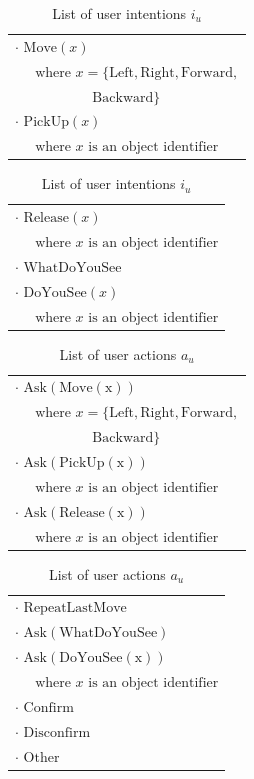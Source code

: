 \renewcommand{\arraystretch}{1.3}

\begin{table}[p]
\begin{footnotesize}
\begin{tabular}{p{60mm}} 
$\cdot$ $\mathrm{Move}(x) $ \\ $ \ \ \ \ \ \text{ where } x=\{\mathrm{Left,Right,Forward,}$ \\ $\ \ \ \ \ \ \ \ \ \ \ \ \ \ \ \ \ \ \ \ \ \ \ \ \ \mathrm{Backward}\} $ \\ 
$\cdot$ $\mathrm{PickUp}(x) $ \\ $\ \ \ \ \  \text{ where } x \text{ is an object identifier}$ 
\end{tabular}
\hspace{2cm}
\begin{tabular}{p{60mm}} 
$\cdot$ $\mathrm{Release}(x) $ \\ $\ \ \ \ \  \text{ where } x \text{ is an object identifier}$ \\
$\cdot$ $\mathrm{WhatDoYouSee}$ \\
$\cdot$ $\mathrm{DoYouSee}(x) $ \\ $\ \ \ \ \  \text{ where } x \text{ is an object identifier}$ 
\end{tabular}
\end{footnotesize}
 \caption{List of user intentions $i_u$} 
\label{table:userintents_exp2}
\end{table}


\begin{table}[p]
\begin{footnotesize}
\begin{tabular}{p{60mm}} 
$\cdot$ $\mathrm{Ask(Move(x))} $ \\ $ \ \ \ \ \ \text{ where } x=\{\mathrm{Left,Right,Forward,}$ \\ $\ \ \ \ \ \ \ \ \ \ \ \ \ \ \ \ \ \ \ \ \ \ \ \ \ \mathrm{Backward}\} $ \\ 
$\cdot$ $\mathrm{Ask(PickUp(x))} $ \\ $\ \ \ \ \  \text{ where } x \text{ is an object identifier}$ \\
$\cdot$ $\mathrm{Ask(Release(x))} $ \\ $\ \ \ \ \  \text{ where } x \text{ is an object identifier}$ 
\end{tabular}
\hspace{2cm}
\begin{tabular}{p{60mm}} 
$\cdot$ $\mathrm{RepeatLastMove}$ \\
$\cdot$ $\mathrm{Ask(WhatDoYouSee)}$ \\
$\cdot$ $\mathrm{Ask(DoYouSee(x))} $ \\ $\ \ \ \ \  \text{ where } x \text{ is an object identifier}$ \\
$\cdot$ $\mathrm{Confirm}$ \\
$\cdot$ $\mathrm{Disconfirm}$ \\
$\cdot$ $\mathrm{Other}$ 
\end{tabular}
\end{footnotesize}
 \caption{List of user actions $a_u$} 
\label{table:userdas_exp2}
\end{table}

